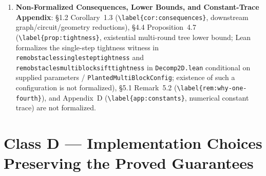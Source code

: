 \documentclass[10pt,letterpaper]{article}
\renewcommand{\_}{\origunderscore\allowbreak}
\newcommand{\code}[1]{\texttt{#1}}
\begin{document}
\begin{enumerate}
  \item \textbf{Non-Formalized Consequences, Lower Bounds, and Constant-Trace Appendix}:
  \S 1.2 Corollary~1.3 (\code{\textbackslash label\{cor:consequences\}}, downstream graph/circuit/geometry reductions), \S 4.4 Proposition~4.7 (\code{\textbackslash label\{prop:tightness\}}, existential multi-round tree lower bound; Lean formalizes the single-step tightness witness in \code{rem\_obstacles\_single\_step\_tightness} and \code{rem\_obstacles\_multiblock\_sift\_tightness} in \code{Decomp2D.lean} conditional on supplied parameters / \code{PlantedMultiBlockConfig}; existence of such a configuration is not formalized), \S 5.1 Remark~5.2 (\code{\textbackslash label\{rem:why-one-fourth\}}), and Appendix~D (\code{\textbackslash label\{app:constants\}}, numerical constant trace) are not formalized.
\end{enumerate}

\section{\texorpdfstring{Class D --- Implementation Choices Preserving the Proved Guarantees}{Class D - Implementation Choices Preserving the Proved Guarantees}}
\label{sec:class-d}
\end{document}
